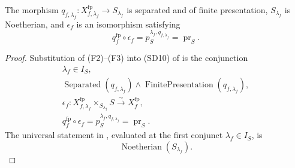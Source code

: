 \begin{lemma}
  \label{lemma:nagata-final-descended-model}
  \checked{}

  The morphism
  $q_{f,\lambda_f}\colon X_{f,\lambda_f}^{\mathrm{fp}}\to S_{\lambda_f}$
  is separated and of
  finite presentation, $S_{\lambda_f}$ is Noetherian, and $\epsilon_f$ is an
  isomorphism satisfying
  \[
    q_f^{\mathrm{fp}}\circ\epsilon_f
      =p_S^{\lambda_f,q_{f,\lambda_f}}
      =\operatorname{pr}_S.
  \]
\end{lemma}

\begin{proof}
  Substitution of (F2)--(F3) into (SD10) of
   is the conjunction
  \[
  \begin{gathered}
    \lambda_f\in I_S,\\
    \operatorname{Separated}(q_{f,\lambda_f})\wedge
      \operatorname{FinitePresentation}(q_{f,\lambda_f}),\\
    \epsilon_f\colon
      X_{f,\lambda_f}^{\mathrm{fp}}\times_{S_{\lambda_f}}S
        \xrightarrow{\sim}X_f^{\mathrm{fp}},\\
    q_f^{\mathrm{fp}}\circ\epsilon_f
      =p_S^{\lambda_f,q_{f,\lambda_f}}
      =\operatorname{pr}_S.
  \end{gathered}
  \]
  The universal statement in
  , evaluated at
  the first conjunct \(\lambda_f\in I_S\), is
  \[
    \operatorname{Noetherian}(S_{\lambda_f}).
  \]
\end{proof}

